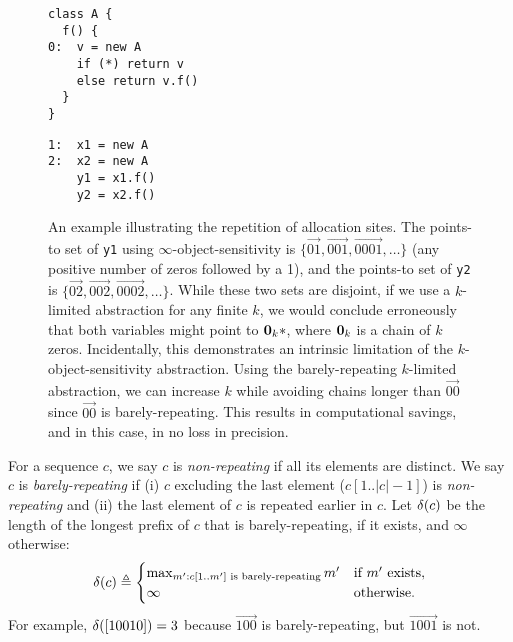 \begin{figure}
\begin{center}
\begin{minipage}{2in}
\begin{verbatim}
class A {
  f() {
0:  v = new A
    if (*) return v
    else return v.f()
  }
}
\end{verbatim}
\end{minipage}
\begin{minipage}{1in}
\begin{verbatim}
1:  x1 = new A
2:  x2 = new A
    y1 = x1.f()
    y2 = x2.f()
\end{verbatim}
\end{minipage}
\end{center}
\caption{\label{fig:recursion} An example illustrating the repetition of allocation sites.
The points-to set of {\tt y1} using $\infty$-object-sensitivity
is $\{\vec{01},\vec{001},\vec{0001},\dots\}$ (any positive number of zeros followed by a 1),
and the points-to set of {\tt y2} is $\{\vec{02},\vec{002},\vec{0002},\dots\}$.
While these two sets are disjoint, if we use a $k$-limited abstraction for any finite $k$,
we would conclude erroneously that both variables might point to $\mathbf{0}_k*$, where $\mathbf{0}_k$ is a chain of $k$ zeros.
Incidentally, this demonstrates an intrinsic limitation of the $k$-object-sensitivity abstraction.
Using the barely-repeating $k$-limited abstraction, we can increase $k$ while avoiding chains longer than $\vec{00}$
since $\vec{00}$ is barely-repeating.
This results in computational savings, and in this case, in no loss in precision.
}
\end{figure}

For a sequence $c$, we say $c$ is {\em non-repeating} if all its elements are distinct.
We say $c$ is {\em barely-repeating} if (i) $c$ excluding the last element ($c[1..|c|-1]$)
is {\em non-repeating} and (ii) the last element of $c$ is repeated earlier in $c$.
Let $\delta(c)$ be the length of the longest prefix of $c$ that is barely-repeating, if it exists, and $\infty$
otherwise:
\begin{align}
\label{eqn:barelyLen}
\delta(c) \triangleq
\begin{cases} 
\max_{m' : c[1..m'] \text{ is barely-repeating}} m' & \text{if $m'$ exists}, \\
\infty & \text{otherwise}.
\end{cases}
\end{align}
For example, $\delta([10010]) = 3$ because $\vec{100}$ is barely-repeating, but $\vec{1001}$ is not.

